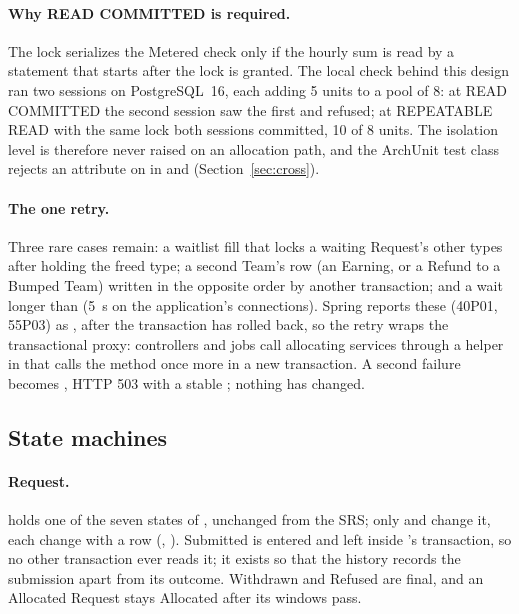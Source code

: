 \paragraph{Why READ COMMITTED is required.} The lock serializes the Metered check only if the hourly sum is read by a statement that starts after the lock is granted. The local check behind this design ran two sessions on PostgreSQL~16, each adding 5 units to a pool of 8: at READ COMMITTED the second session saw the first and refused; at REPEATABLE READ with the same lock both sessions committed, 10 of 8 units. The isolation level is therefore never raised on an allocation path, and the ArchUnit test class rejects an  attribute on  in  and  (Section~\ref{sec:cross}).

\paragraph{The one retry.} Three rare cases remain: a waitlist fill that locks a waiting Request's other types after holding the freed type; a second Team's  row (an Earning, or a Refund to a Bumped Team) written in the opposite order by another transaction; and a wait longer than  (5~s on the application's connections). Spring reports these (40P01, 55P03) as , after the transaction has rolled back, so the retry wraps the transactional proxy: controllers and jobs call allocating services through a helper in  that calls the method once more in a new transaction. A second failure becomes , HTTP 503 with a stable ; nothing has changed.

\subsection{State machines}

\paragraph{Request.}  holds one of the seven states of , unchanged from the SRS; only  and  change it, each change with a  row (, ). Submitted is entered and left inside 's transaction, so no other transaction ever reads it; it exists so that the history records the submission apart from its outcome. Withdrawn and Refused are final, and an Allocated Request stays Allocated after its windows pass.

